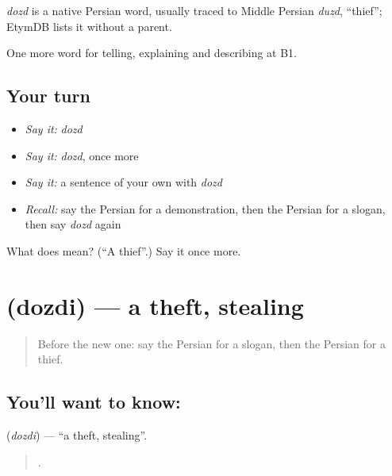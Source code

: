 \begin{cousinweb}
\emph{dozd} is a native Persian word, usually traced to Middle Persian \emph{duzd}, \textquotedblleft{}thief\textquotedblright{}; EtymDB lists it without a parent.
\end{cousinweb}

\begin{grammarlens}[title={What you've built}]
One more word for telling, explaining and describing at B1.
\end{grammarlens}

\subsection*{Your turn}
\begin{itemize}
\raggedright
  \item \emph{Say it:} \emph{dozd}
  \item \emph{Say it:} \emph{dozd}, once more
  \item \emph{Say it:} a sentence of your own with \emph{dozd}
  \item \emph{Recall:} say the Persian for a demonstration, then the Persian for a slogan, then say \emph{dozd} again
\end{itemize}

\begin{tcolorbox}[breakable,colback=teal!4,colframe=teal!35!black,title={Before you move on}]
What does  mean? (\textquotedblleft{}A thief\textquotedblright{}.) Say it once more.
\end{tcolorbox}
\section[\texorpdfstring{\fa{دزدی} (dozdi)}{دزدی (dozdi)}]{ (dozdi) — a theft, stealing}

\label{lesson:FA-C316-dozdi}



\begin{quote}
Before the new one: say the Persian for a slogan, then the Persian for a thief.
\end{quote}

\subsection*{You'll want to know: }
\textbf{} (\emph{dozdi}) — \textquotedblleft{}a theft, stealing\textquotedblright{}.

\begin{quote}
     .
\end{quote}


